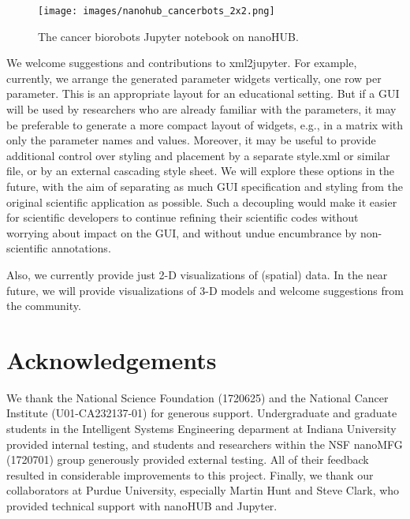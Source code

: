 \documentclass[10pt,letterpaper]{article}
\begin{document}
\begin{figure}
\centering
\texttt{[image: images/nanohub\_cancerbots\_2x2.png]}
\caption{The cancer biorobots Jupyter notebook on nanoHUB.}
\end{figure}

We welcome suggestions and contributions to xml2jupyter. For example,
currently, we arrange the generated parameter widgets vertically, one
row per parameter. This is an appropriate layout for an educational
setting. But if a GUI will be used by researchers who are already
familiar with the parameters, it may be preferable to generate a more
compact layout of widgets, e.g., in a matrix with only the parameter
names and values. Moreover, it may be useful to provide additional
control over styling and placement by a separate style.xml or similar
file, or by an external cascading style sheet. We will explore these
options in the future, with the aim of separating as much GUI
specification and styling from the original scientific application as
possible. Such a decoupling would make it easier for scientific
developers to continue refining their scientific codes without worrying
about impact on the GUI, and without undue encumbrance by non-scientific
annotations.

Also, we currently provide just 2-D visualizations of (spatial) data. In
the near future, we will provide visualizations of 3-D models and
welcome suggestions from the community.

\section*{Acknowledgements}

We thank the National Science Foundation (1720625) and the National
Cancer Institute (U01-CA232137-01) for generous support. Undergraduate
and graduate students in the Intelligent Systems Engineering deparment
at Indiana University provided internal testing, and students and
researchers within the NSF nanoMFG (1720701) group generously provided
external testing. All of their feedback resulted in considerable
improvements to this project. Finally, we thank our collaborators at
Purdue University, especially Martin Hunt and Steve Clark, who provided
technical support with nanoHUB and Jupyter.


\end{document}
